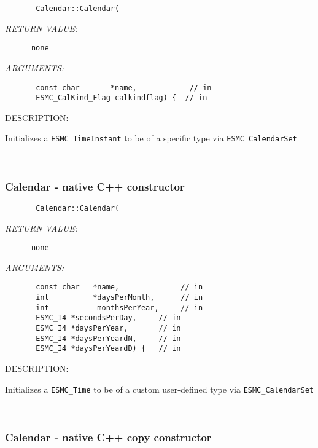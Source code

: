   
\begin{verbatim}       Calendar::Calendar(\end{verbatim}{\em RETURN VALUE:}
\begin{verbatim}      none\end{verbatim}{\em ARGUMENTS:}
\begin{verbatim}       const char       *name,            // in
       ESMC_CalKind_Flag calkindflag) {  // in\end{verbatim}
{\sf DESCRIPTION:\\ }


        Initializes a {\tt ESMC\_TimeInstant} to be of a specific type via
        {\tt ESMC\_CalendarSet}
   
 
\mbox{}\hrulefill\ 
 
\subsubsection [Calendar] {Calendar - native C++ constructor}


  
\begin{verbatim}       Calendar::Calendar(\end{verbatim}{\em RETURN VALUE:}
\begin{verbatim}      none\end{verbatim}{\em ARGUMENTS:}
\begin{verbatim}       const char   *name,              // in
       int          *daysPerMonth,      // in
       int           monthsPerYear,     // in
       ESMC_I4 *secondsPerDay,     // in
       ESMC_I4 *daysPerYear,       // in
       ESMC_I4 *daysPerYeardN,     // in
       ESMC_I4 *daysPerYeardD) {   // in\end{verbatim}
{\sf DESCRIPTION:\\ }


        Initializes a {\tt ESMC\_Time} to be of a custom user-defined type
        via {\tt ESMC\_CalendarSet}
   
 
\mbox{}\hrulefill\ 
 
\subsubsection [Calendar] {Calendar - native C++ copy constructor}


